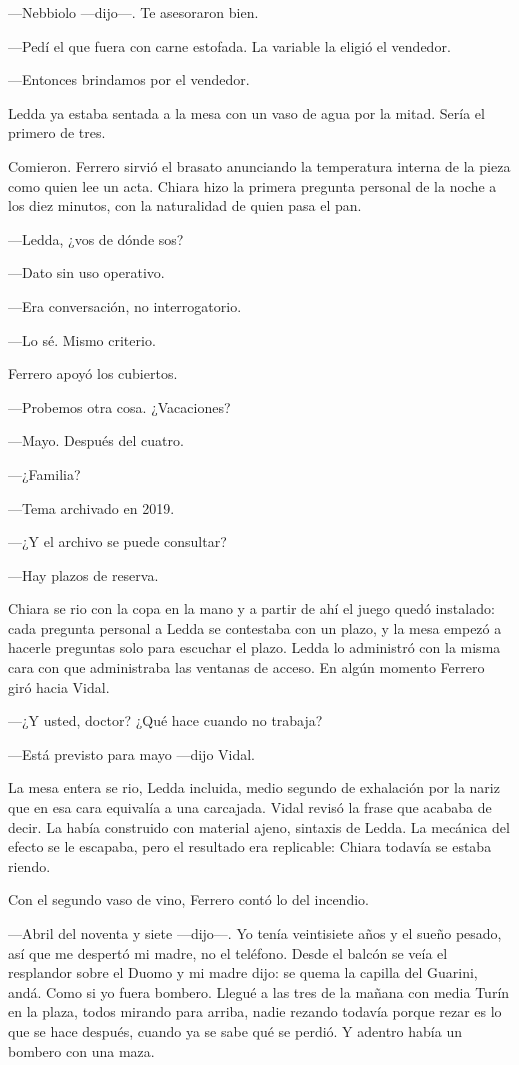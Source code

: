 ---Nebbiolo ---dijo---. Te asesoraron bien.

---Pedí el que fuera con carne estofada. La variable la eligió el vendedor.

---Entonces brindamos por el vendedor.

Ledda ya estaba sentada a la mesa con un vaso de agua por la mitad. Sería el primero de tres.

Comieron. Ferrero sirvió el brasato anunciando la temperatura interna de la pieza como quien lee un acta. Chiara hizo la primera pregunta personal de la noche a los diez minutos, con la naturalidad de quien pasa el pan.

---Ledda, ¿vos de dónde sos?

---Dato sin uso operativo.

---Era conversación, no interrogatorio.

---Lo sé. Mismo criterio.

Ferrero apoyó los cubiertos.

---Probemos otra cosa. ¿Vacaciones?

---Mayo. Después del cuatro.

---¿Familia?

---Tema archivado en 2019.

---¿Y el archivo se puede consultar?

---Hay plazos de reserva.

Chiara se rio con la copa en la mano y a partir de ahí el juego quedó instalado: cada pregunta personal a Ledda se contestaba con un plazo, y la mesa empezó a hacerle preguntas solo para escuchar el plazo. Ledda lo administró con la misma cara con que administraba las ventanas de acceso. En algún momento Ferrero giró hacia Vidal.

---¿Y usted, doctor? ¿Qué hace cuando no trabaja?

---Está previsto para mayo ---dijo Vidal.

La mesa entera se rio, Ledda incluida, medio segundo de exhalación por la nariz que en esa cara equivalía a una carcajada. Vidal revisó la frase que acababa de decir. La había construido con material ajeno, sintaxis de Ledda. La mecánica del efecto se le escapaba, pero el resultado era replicable: Chiara todavía se estaba riendo.

Con el segundo vaso de vino, Ferrero contó lo del incendio.

---Abril del noventa y siete ---dijo---. Yo tenía veintisiete años y el sueño pesado, así que me despertó mi madre, no el teléfono. Desde el balcón se veía el resplandor sobre el Duomo y mi madre dijo: se quema la capilla del Guarini, andá. Como si yo fuera bombero. Llegué a las tres de la mañana con media Turín en la plaza, todos mirando para arriba, nadie rezando todavía porque rezar es lo que se hace después, cuando ya se sabe qué se perdió. Y adentro había un bombero con una maza.

